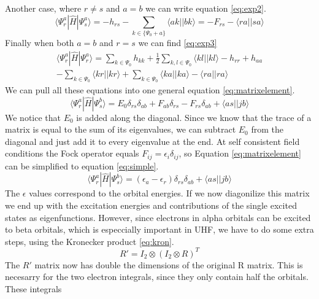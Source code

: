 \documentclass[twoside,twocolumn,9pt]{article}
\begin{document}
Another case, where $r \neq s$ and $a = b$ we can write equation \eqref{eq:exp2}.
\begin{equation}\label{eq:exp2}
  \langle \Psi_r^a|\hat{H}|\Psi^a_s \rangle = -h_{rs} - \sum_{k \in \{\Psi_0 + a\}} \langle ak || bk \rangle = -F_{rs} - \langle ra || sa \rangle
\end{equation}
Finally when both $a = b$ and $r = s$ we can find \eqref{eq:exp3}
\begin{multline}\label{eq:exp3}
  \langle \Psi^a_r|\hat{H}|\Psi^a_r \rangle = \sum_{k \in \Psi_0}h_{kk} + \frac{1}{2}\sum_{k,l \in \Psi_0} \langle kl||kl \rangle - h_{rr} + h_{aa} \\ - \sum_{k \in \Psi_0} \langle
  kr || kr \rangle + \sum_{k \in \Psi_0} \langle ka||ka \rangle - \langle ra||ra \rangle 
\end{multline}
We can pull all these equations into one general equation \eqref{eq:matrixelement}.
\begin{equation}\label{eq:matrixelement}
  \langle \Psi_r^a|\hat{H}|\Psi_s^b \rangle = E_0\delta_{rs}\delta_{ab} + F_{ab}\delta_{rs} - F_{rs}\delta_{ab} + \langle as || jb \rangle
\end{equation}
We notice that $E_0$ is added along the diagonal. Since we know that the trace of a matrix is equal to the sum of its eigenvalues, we can subtract $E_0$ from the diagonal and just 
add it to every eigenvalue at the end. At self consistent field conditions the Fock operator equals $F_{ij} = \epsilon_i\delta_{ij}$, so Equation \eqref{eq:matrixelement} can be 
simplified to equation \eqref{eq:simple}. 
\begin{equation}\label{eq:simple}
  \langle \Psi_r^a|\hat{H}|\Psi_s^b \rangle = (\epsilon_a - \epsilon_r)\delta_{rs}\delta_{ab} + \langle as || jb \rangle
\end{equation}
The $\epsilon$ values correspond to the orbital energies. If we now diagonilize this matrix we end up with the excitation energies and contributions of the single excited states as 
eigenfunctions. However, since electrons in alpha orbitals can be excited to beta orbitals, which is especcially important in UHF, we have to do some extra steps, using the 
Kronecker product \eqref{eq:kron}.
\begin{equation}\label{eq:kron}
    R' = I_2 \otimes (I_2 \otimes R)^T
\end{equation}
The $R'$ matrix now has double the dimensions of the original R matrix. This is necesarry for the two electron integrals, since they only contain half the orbitals. These integrals 
\end{document}
